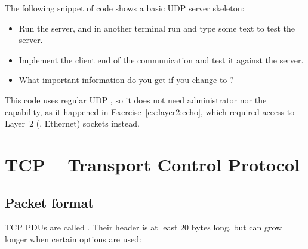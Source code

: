 \begin{exercise}
The following snippet of code shows a basic UDP server skeleton:

\begin{center}
\end{center}

\begin{itemize}
\item Run the server, and in another terminal run  and type some text to test 
  the server.
\item Implement the client end of the communication and test it against the server.
\item What important information do you get if you change  to ?
\end{itemize}

\begin{remark}
This code uses regular UDP , so it does not need administrator 
nor the  capability, as it happened in Exercise~\ref{ex:layer2:echo},
which required access to Layer~2 (\eg, Ethernet) sockets instead.
\end{remark}
\end{exercise}

\section{TCP -- Transport Control Protocol}\label{sec:layer4:tcp}
\subsection{Packet format}\label{sec:layer4:tcp:packet_format}

TCP PDUs are called .
Their header is at least $20$ bytes long, but can grow longer when certain options are used:

